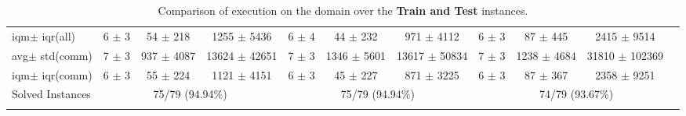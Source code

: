 \documentclass{article}
\newcommand{\myAvg}{avg}
\newcommand{\myStd}{std}
\newcommand{\IQM}{iqm}
\newcommand{\IQR}{iqr}
\newcommand{\allInstances}{all}
\newcommand{\onlyInCommon}{comm}
\begin{document}
\begin{longtable}[!ht]{l|ccc|ccc|cccc}
\IQM $\pm$ \IQR \hfill (\allInstances) & 6 $\pm$ 3 & 54 $\pm$ 218 & 1255 $\pm$ 5436 & 6 $\pm$ 4 & 44 $\pm$ 232 & 971 $\pm$ 4112 & 6 $\pm$ 3 & 87 $\pm$ 445 & 2415 $\pm$ 9514 &  \\
\myAvg  $\pm$ \myStd \hfill (\onlyInCommon) & 7 $\pm$ 3 & 937 $\pm$ 4087 & 13624 $\pm$ 42651 & 7 $\pm$ 3 & 1346 $\pm$ 5601 & 13617 $\pm$ 50834 & 7 $\pm$ 3 & 1238 $\pm$ 4684 & 31810 $\pm$ 102369 &  \\
\IQM $\pm$ \IQR \hfill (\onlyInCommon) & 6 $\pm$ 3 & 55 $\pm$ 224 & 1121 $\pm$ 4151 & 6 $\pm$ 3 & 45 $\pm$ 227 & 871 $\pm$ 3225 & 6 $\pm$ 3 & 87 $\pm$ 367 & 2358 $\pm$ 9251 &  \\
Solved Instances & \multicolumn{3}{c|}{75/79 (94.94\%)} & \multicolumn{3}{c|}{75/79 (94.94\%)} & \multicolumn{4}{c}{74/79 (93.67\%)}
\\
\caption{Comparison of execution on the {} domain over the \textbf{Train and Test} instances.}
\label{tab:final_reports_comparison_train_and_test}
\end{longtable}
\end{document}
